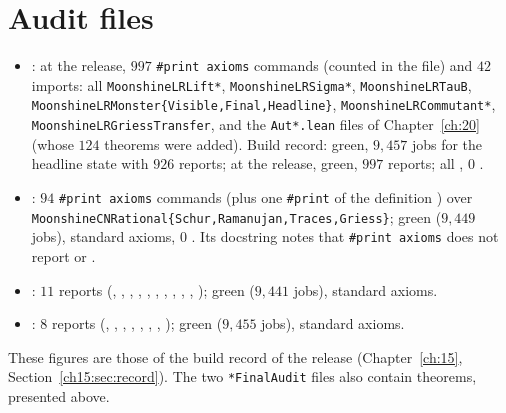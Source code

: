 \section{Audit files}\label{ch22:sec:audits}

\begin{itemize}
\item {}: at the release, $997$ \texttt{\#print axioms}
  commands (counted in the file) and $42$ imports: all \texttt{MoonshineLRLift*}, \texttt{MoonshineLRSigma*},
  \texttt{MoonshineLRTauB}, \texttt{MoonshineLRMonster\{Visible,Final,Headline\}}, \texttt{MoonshineLRCommutant*},
  \texttt{MoonshineLRGriessTransfer}, and the \texttt{Aut*.lean} files of
  Chapter~\ref{ch:20} (whose $124$ theorems were added).  Build record: green, $9{,}457$
  jobs for the headline state with $926$ reports; at the release, green, $997$ reports; all
  , $0$ .
\item {}: $94$ \texttt{\#print axioms} commands (plus one \texttt{\#print}
  of the definition ) over
  \texttt{MoonshineCNRational\{Schur,Ramanujan,Traces,Griess\}}; green ($9{,}449$ jobs), standard axioms, $0$ .  Its
  docstring notes that \texttt{\#print axioms} does not report  or .
\item {}: $11$ reports (,
  , , , ,
  , , , ,
  , ); green ($9{,}441$ jobs), standard axioms.
\item {}: $8$ reports (,
  , , ,
  , , , ); green
  ($9{,}455$ jobs), standard axioms.
\end{itemize}
These figures are those of the build record of the release (Chapter~\ref{ch:15}, Section~\ref{ch15:sec:record}).  The two
\texttt{*FinalAudit} files also contain theorems, presented above.

